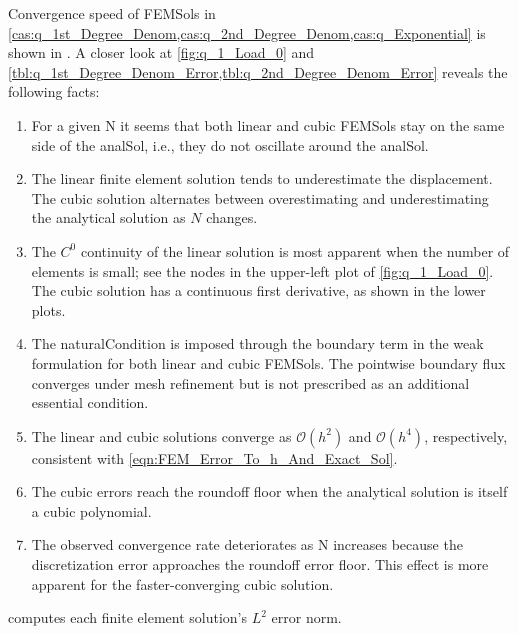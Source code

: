 Convergence speed of \glspl{FEMSol} in \cref{cas:q_1st_Degree_Denom,cas:q_2nd_Degree_Denom,cas:q_Exponential} is shown in . A closer look at \cref{fig:q_1_Load_0} and \cref{tbl:q_1st_Degree_Denom_Error,tbl:q_2nd_Degree_Denom_Error} reveals the following facts:
\begin{enumerate}
	\item For a given \gls{N} it seems that both linear and cubic \glspl{FEMSol} stay on the same side of the \gls{analSol}, i.e., they do not oscillate around the \gls{analSol}.

	\item The linear finite element solution tends to underestimate the displacement. The cubic solution alternates between
	overestimating and underestimating the analytical solution as $N$ changes.

	\item The $C^0$ continuity of the linear solution is most apparent when the number of elements is small; see the nodes in the
	upper-left plot of \cref{fig:q_1_Load_0}. The cubic solution has a continuous first derivative, as shown in the lower plots.

	\item The \gls{naturalCondition} is imposed through the boundary term in the weak formulation for both linear and cubic \glspl{FEMSol}. The pointwise boundary flux converges under mesh refinement but is not prescribed as an additional essential condition.

	\item The linear and cubic solutions converge as $\mathcal{O}(h^2)$ and $\mathcal{O}(h^4)$, respectively, consistent with
	\cref{eqn:FEM_Error_To_h_And_Exact_Sol}.

	\item The cubic errors reach the roundoff floor when the analytical solution is itself a cubic polynomial.

	\item The observed convergence rate deteriorates as \gls{N} increases because the discretization error approaches the roundoff
	error floor. This effect is more apparent for the faster-converging cubic solution.
\end{enumerate}	\text{}
%
 computes each finite element solution's $L^2$ error norm.
